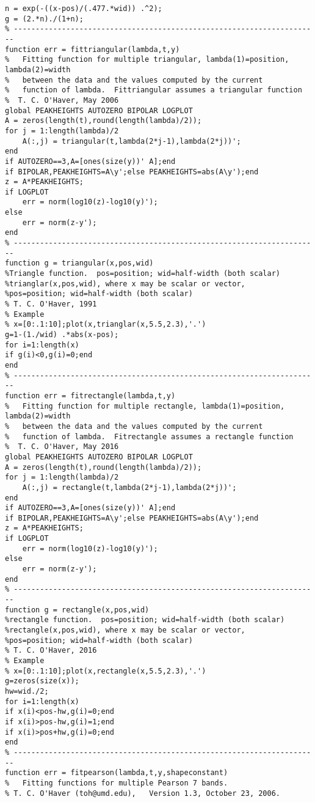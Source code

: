 \begin{lstlisting}
n = exp(-((x-pos)/(.477.*wid)) .^2);
g = (2.*n)./(1+n);
% ----------------------------------------------------------------------
function err = fittriangular(lambda,t,y)
%	Fitting function for multiple triangular, lambda(1)=position, lambda(2)=width
%	between the data and the values computed by the current
%	function of lambda.  Fittriangular assumes a triangular function 
%  T. C. O'Haver, May 2006
global PEAKHEIGHTS AUTOZERO BIPOLAR LOGPLOT
A = zeros(length(t),round(length(lambda)/2));
for j = 1:length(lambda)/2
    A(:,j) = triangular(t,lambda(2*j-1),lambda(2*j))';
end
if AUTOZERO==3,A=[ones(size(y))' A];end
if BIPOLAR,PEAKHEIGHTS=A\y';else PEAKHEIGHTS=abs(A\y');end
z = A*PEAKHEIGHTS;
if LOGPLOT
    err = norm(log10(z)-log10(y)');
else
    err = norm(z-y');
end
% ----------------------------------------------------------------------
function g = triangular(x,pos,wid)
%Triangle function.  pos=position; wid=half-width (both scalar)
%trianglar(x,pos,wid), where x may be scalar or vector,
%pos=position; wid=half-width (both scalar)
% T. C. O'Haver, 1991
% Example
% x=[0:.1:10];plot(x,trianglar(x,5.5,2.3),'.')
g=1-(1./wid) .*abs(x-pos);
for i=1:length(x)
if g(i)<0,g(i)=0;end
end
% ----------------------------------------------------------------------
function err = fitrectangle(lambda,t,y)
%	Fitting function for multiple rectangle, lambda(1)=position, lambda(2)=width
%	between the data and the values computed by the current
%	function of lambda.  Fitrectangle assumes a rectangle function 
%  T. C. O'Haver, May 2016
global PEAKHEIGHTS AUTOZERO BIPOLAR LOGPLOT
A = zeros(length(t),round(length(lambda)/2));
for j = 1:length(lambda)/2
    A(:,j) = rectangle(t,lambda(2*j-1),lambda(2*j))';
end
if AUTOZERO==3,A=[ones(size(y))' A];end
if BIPOLAR,PEAKHEIGHTS=A\y';else PEAKHEIGHTS=abs(A\y');end
z = A*PEAKHEIGHTS;
if LOGPLOT
    err = norm(log10(z)-log10(y)');
else
    err = norm(z-y');
end
% ----------------------------------------------------------------------
function g = rectangle(x,pos,wid)
%rectangle function.  pos=position; wid=half-width (both scalar)
%rectangle(x,pos,wid), where x may be scalar or vector,
%pos=position; wid=half-width (both scalar)
% T. C. O'Haver, 2016
% Example
% x=[0:.1:10];plot(x,rectangle(x,5.5,2.3),'.')
g=zeros(size(x));
hw=wid./2;
for i=1:length(x)
if x(i)<pos-hw,g(i)=0;end
if x(i)>pos-hw,g(i)=1;end
if x(i)>pos+hw,g(i)=0;end
end
% ----------------------------------------------------------------------
function err = fitpearson(lambda,t,y,shapeconstant)
%   Fitting functions for multiple Pearson 7 bands.
% T. C. O'Haver (toh@umd.edu),   Version 1.3, October 23, 2006.

\end{lstlisting}
